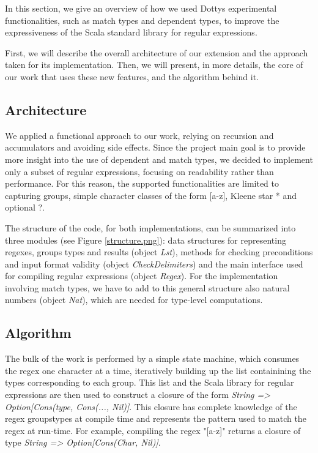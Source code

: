 In this section, we give an overview of how we used Dotty\textquotesingle s experimental functionalities, such as match types and dependent types, to improve the expressiveness of the Scala standard library for regular expressions.

First, we will describe the overall architecture of our extension and the approach taken for its implementation. Then, we will present, in more details, the core of our work that uses these new features, and the algorithm behind it.

\subsection{Architecture}\label{architecture}
We applied a functional approach to our work, relying on recursion and accumulators and avoiding side effects. Since the project main goal is to provide more insight into the use of dependent and match types, we decided to implement only a subset of regular expressions, focusing on readability rather than performance. For this reason, the supported functionalities are limited to capturing groups, simple character classes of the form [a-z], Kleene star * and optional ?.

The structure of the code, for both implementations, can be summarized into three modules (see Figure \ref{structure.png}): data structures for representing regexes, groups types and results (object \textit{Lst}), methods for checking preconditions and input format validity (object \textit{CheckDelimiters}) and the main interface used for compiling regular expressions (object \textit{Regex}). For the implementation involving match types, we have to add to this general structure also natural numbers (object \textit{Nat}), which are needed for type-level computations.

\subsection{Algorithm}
The bulk of the work is performed by a simple state machine, which consumes the regex one character at a time, iteratively building up the list containining the types corresponding to each group. This list and the Scala library for regular expressions are then used to construct a closure of the form \textit{String => Option[Cons(type, Cons(..., Nil)]}. This closure has complete knowledge of the regex groups\textquotesingle \space types at compile time and represents the pattern used to match the regex at run-time.
For example, compiling the regex "[a-z]" returns a closure of type \textit{String => Option[Cons(Char, Nil)]}.

